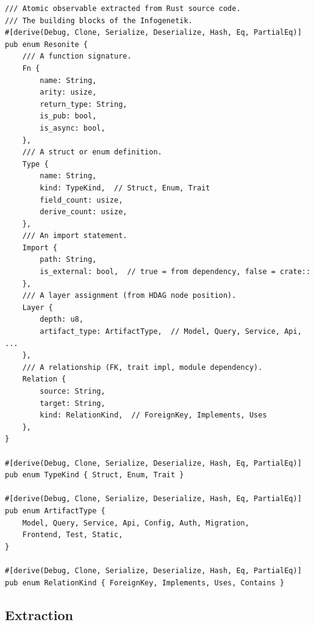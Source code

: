 \documentclass[11pt,a4paper]{article}
\begin{document}
\begin{lstlisting}[style=rust]
/// Atomic observable extracted from Rust source code.
/// The building blocks of the Infogenetik.
#[derive(Debug, Clone, Serialize, Deserialize, Hash, Eq, PartialEq)]
pub enum Resonite {
    /// A function signature.
    Fn {
        name: String,
        arity: usize,
        return_type: String,
        is_pub: bool,
        is_async: bool,
    },
    /// A struct or enum definition.
    Type {
        name: String,
        kind: TypeKind,  // Struct, Enum, Trait
        field_count: usize,
        derive_count: usize,
    },
    /// An import statement.
    Import {
        path: String,
        is_external: bool,  // true = from dependency, false = crate::
    },
    /// A layer assignment (from HDAG node position).
    Layer {
        depth: u8,
        artifact_type: ArtifactType,  // Model, Query, Service, Api, ...
    },
    /// A relationship (FK, trait impl, module dependency).
    Relation {
        source: String,
        target: String,
        kind: RelationKind,  // ForeignKey, Implements, Uses
    },
}

#[derive(Debug, Clone, Serialize, Deserialize, Hash, Eq, PartialEq)]
pub enum TypeKind { Struct, Enum, Trait }

#[derive(Debug, Clone, Serialize, Deserialize, Hash, Eq, PartialEq)]
pub enum ArtifactType {
    Model, Query, Service, Api, Config, Auth, Migration,
    Frontend, Test, Static,
}

#[derive(Debug, Clone, Serialize, Deserialize, Hash, Eq, PartialEq)]
pub enum RelationKind { ForeignKey, Implements, Uses, Contains }
\end{lstlisting}

\subsection{Extraction}
\end{document}
